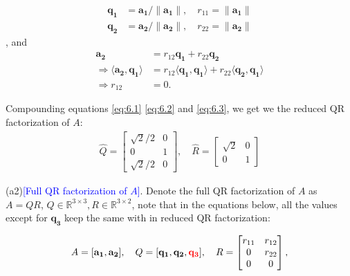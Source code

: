 \begin{align}
    \label{eq:6.1}
    \mathbf{q_1} &= \mathbf{a_1}/\|\mathbf{a_1}\|, \quad r_{11} = \|\mathbf{a_1}\|\\
    \label{eq:6.2}
    \mathbf{q_2} &= \mathbf{a_2}/\|\mathbf{a_2}\|, \quad r_{22} = \|\mathbf{a_2}\|
\end{align},
and 
\begin{align}
    \mathbf{a_2} &= r_{12}\mathbf{q_1} + r_{22}\mathbf{q_2}
    \nonumber \\
    \Rightarrow
    \langle\mathbf{a_2}, \mathbf{q_1} \rangle 
    &=  
    r_{12} \langle\mathbf{q_1}, \mathbf{q_1} \rangle 
    + r_{22}\langle\mathbf{q_2}, \mathbf{q_1} \rangle 
    \nonumber \\
    \label{eq:6.3}
    \Rightarrow r_{12} &= 0.
\end{align}

Compounding equations \eqref{eq:6.1} \eqref{eq:6.2} and \eqref{eq:6.3}, 
we get we the reduced QR factorization of $A$:
\begin{align*}
    \hat{Q} = \begin{bmatrix}
        \sqrt{2}/2 & 0\\ 0 & 1\\ \sqrt{2}/2 & 0
    \end{bmatrix},\quad
    \hat{R} = \begin{bmatrix}
        \sqrt{2} & 0\\ 0 & 1
        \end{bmatrix}
    \end{align*}


(a2)\textcolor{blue}{[Full QR factorization of $A$]}. 
Denote the full QR factorization of $A$ as
$A = QR$, $
    Q \in \mathbb{R}^{3 \times 3},
    R \in \mathbb{R}^{3 \times 2} 
    $,
note that in the equations below, 
all the values except for $\mathbf{q_3}$
keep the same with in reduced QR factorization:

\begin{align*}
    A = [\mathbf{a_1}, \mathbf{a_2}],
    \quad 
    Q = [\mathbf{q_1}, \mathbf{q_2},\textcolor{red}{\mathbf{q_3}}], \quad
    R = \begin{bmatrix}
                r_{11} & r_{12} 
                \\ 0 & r_{22} 
                \\ 0 & 0 
            \end{bmatrix},\\
\end{align*}

